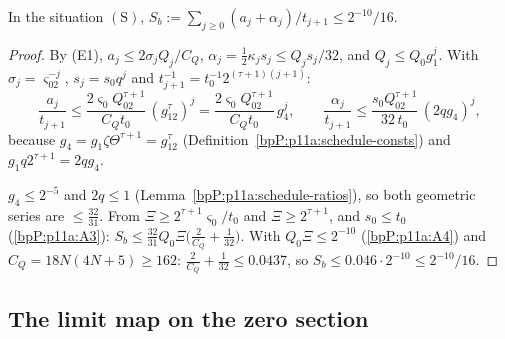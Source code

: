 \begin{lemma}\label{bpP:p11a:param-lip-sum}
In the situation $(\mathrm S)$, $S_b:=\sum_{j\ge0}(a_j+\alpha_j)/t_{j+1}\le2^{-10}/16$.
\end{lemma}
\begin{proof}
\label{stepP:p11a:pl4-terms} By (E1), $a_j\le2\sigma_jQ_j/C_Q$, $\alpha_j=\frac12\kappa_js_j\le Q_js_j/32$, and $Q_j\le Q_0g_1^j$. With $\sigma_j=\varsigma_02^{-j}$, $s_j=s_0q^j$ and $t_{j+1}^{-1}=t_0^{-1}2^{(\tau+1)(j+1)}$:
\[\frac{a_j}{t_{j+1}}\le\frac{2\varsigma_0Q_02^{\tau+1}}{C_Qt_0}\,(g_12^{\tau})^j=\frac{2\varsigma_0Q_02^{\tau+1}}{C_Qt_0}\,g_4^j,\qquad \frac{\alpha_j}{t_{j+1}}\le\frac{s_0Q_02^{\tau+1}}{32\,t_0}\,(2qg_4)^j,\]
because $g_4=g_1\zeta\Theta^{\tau+1}=g_12^{\tau}$ (Definition~\ref{bpP:p11a:schedule-consts}) and $g_1q2^{\tau+1}=2qg_4$.

\label{stepP:p11a:pl4-sum} $g_4\le2^{-5}$ and $2q\le1$ (Lemma~\ref{bpP:p11a:schedule-ratios}), so both geometric series are $\le\frac{32}{31}$. From $\Xi\ge2^{\tau+1}\varsigma_0/t_0$ and $\Xi\ge2^{\tau+1}$, and $s_0\le t_0$ (\ref{bpP:p11a:A3}): $S_b\le\frac{32}{31}Q_0\Xi\bigl(\frac2{C_Q}+\frac1{32}\bigr)$. With $Q_0\Xi\le2^{-10}$ (\ref{bpP:p11a:A4}) and $C_Q=18N(4N+5)\ge162$: $\frac2{C_Q}+\frac1{32}\le0.0437$, so $S_b\le0.046\cdot2^{-10}\le2^{-10}/16$.
\end{proof}

\subsection{The limit map on the zero section}\label{bpP:p11a:sec-limit}

